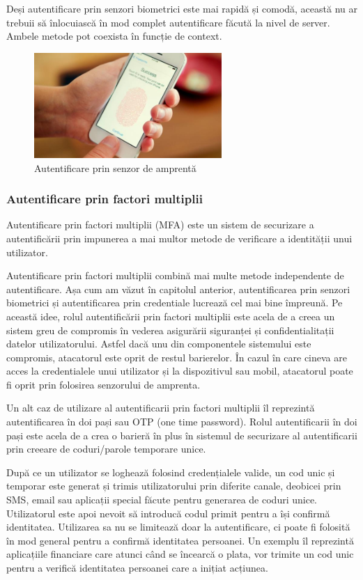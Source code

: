 \documentclass[12pt]{article}
\begin{document}
Deși autentificare prin senzori biometrici este mai rapidă și comodă, această nu ar trebuii
să înlocuiască în mod complet autentificare făcută la nivel de server. 
Ambele metode pot coexista în funcție de context.

\begin{figure}[H]
\centering
\includegraphics[height=4cm]{fingerprint-smartphone_0.jpg}
\caption{Autentificare prin senzor de amprentă}
\end{figure}

\subsubsection{Autentificare prin factori multiplii}

Autentificare prin factori multiplii (MFA) este un sistem de securizare a autentificării
prin impunerea a mai multor metode de verificare a identității unui utilizator.

Autentificare prin factori multiplii combină mai multe metode independente de autentificare.
Așa cum am văzut în capitolul anterior, autentificarea prin senzori biometrici și autentificarea
prin credentiale lucrează cel mai bine împreună. Pe această idee, rolul autentificării prin factori
multiplii este acela de a creea un sistem greu de compromis în vederea asigurării siguranței și
confidentialitații datelor utilizatorului. Astfel dacă unu din componentele sistemului este compromis,
atacatorul este oprit de restul barierelor. În cazul în care cineva are acces la credentialele unui 
utilizator și la dispozitivul sau mobil, atacatorul poate fi oprit prin folosirea senzorului de amprenta.

Un alt caz de utilizare al autentificarii prin factori multiplii îl reprezintă autentificarea în doi pași
sau OTP (one time password). Rolul autentificarii în doi pași este acela de a crea o barieră în plus
în sistemul de securizare al autentificarii prin creeare de coduri/parole temporare unice.

După ce un utilizator se loghează folosind credențialele valide, un cod unic și temporar este generat
și trimis utilizatorului prin diferite canale, deobicei prin SMS, email sau aplicații special făcute
pentru generarea de coduri unice. Utilizatorul este apoi nevoit să introducă codul primit pentru
a își confirmă identitatea. Utilizarea sa nu se limitează doar la autentificare, ci poate fi folosită în
mod general pentru a confirmă identitatea persoanei. Un exemplu îl reprezintă aplicațiile financiare care
atunci când se încearcă o plata, vor trimite un cod unic pentru a verifică identitatea persoanei care 
a inițiat acțiunea.
\end{document}
